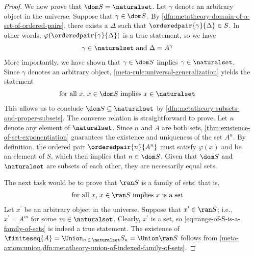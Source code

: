 \begin{proof}
    \vspace{0.3cm}
    \noindent
    We now prove that \( \dom S = \naturalset \).
    Let \( \gamma \) denote an arbitrary object in the universe.
    Suppose that \( \gamma \in \dom S \).
    By \cref{dfn:metatheory-domain-of-a-set-of-ordered-pairs}, there exists a \( \Delta \) such that \( \orderedpair{\gamma}{\Delta} \in S \).
    In other words, \( \varphi(\orderedpair{\gamma}{\Delta}) \) is a true statement, so we have
    \begin{equation*}
        \gamma \in \naturalset \ \text{and} \ \Delta = A^{\gamma}
    \end{equation*}
    More importantly, we have shown that \( \gamma \in \dom S \) implies \( \gamma \in \naturalset \). Since \( \gamma \) denotes
    an arbitrary object, \cref{meta-rule:universal-generalization} yields the statement
    \begin{equation*}
        \text{for all \( x \), \( x \in \dom S \) implies \( x \in \naturalset \)}
    \end{equation*}
    This allows us to conclude \( \dom S \subseteq \naturalset \) by \cref{dfn:metatheory-subsets-and-proper-subsets}.
    The converse relation is straightforward to prove. Let \( n \) denote any element of \( \naturalset \).
    Since \( n \) and \( A \) are both sets, \cref{thm:existence-of-set-exponentiation} guarantees the existence and uniqueness of the set
    \( A^{n} \).
    By definition, the ordered pair \( \orderedpair{n}{A^{n}} \) must satisfy \( \varphi(x) \) and be an element of \( S \), which then implies that
    \( n \in \dom S \).
    Given that \( \dom S \) and \( \naturalset \) are subsets of each other, they are necessarily equal sets.

    \vspace{0.3cm}
    \noindent
    The next task would be to prove that \( \ran S \) is a family of sets; that is,
    \begin{equation}
        \label{eq:range-of-S-is-a-family-of-sets}
        \text{for all \( x \), \( x \in \ran S \) implies \( x \) is a set}
    \end{equation}
    Let \( x^{\prime} \) be an arbitrary object in the universe.
    Suppose that \( x^{\prime} \in \ran S \); i.e., \( x^{\prime} = A^{m} \) for some \( m \in \naturalset \).
    Clearly, \( x^{\prime} \) is a set, so \eqref{eq:range-of-S-is-a-family-of-sets} is indeed a true statement.
    The existence of \( \finiteseq{A} = \Union_{n \,\in\, \naturalset} S_{n} = \Union \ran S \) follows from
    \cref{meta-axiom:union,dfn:metatheory-union-of-indexed-family-of-sets}.
\end{proof}




